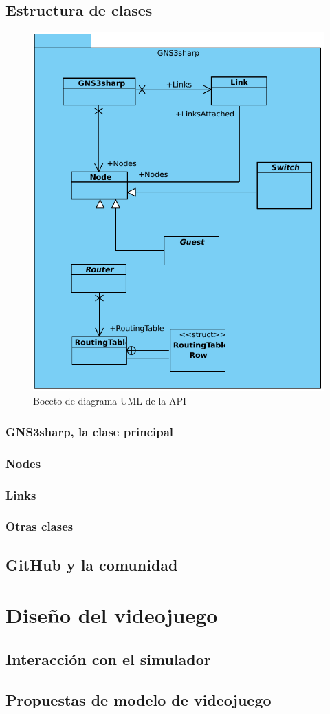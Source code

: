\subsection{Estructura de clases}
\begin{figure}[h]
  \centering
  \includegraphics{imagenes/diagrama_api1}
  \caption{Boceto de diagrama UML de la API}
  \label{fig:diagrama_api1}
\end{figure}
\subsubsection[''La clase principal'']{GNS3sharp, la clase principal}
\subsubsection{Nodes}
\subsubsection{Links}
\subsubsection{Otras clases}
\subsection{GitHub y la comunidad}


\section{Diseño del videojuego}
\subsection{Interacción con el simulador}
\subsection{Propuestas de modelo de videojuego}



